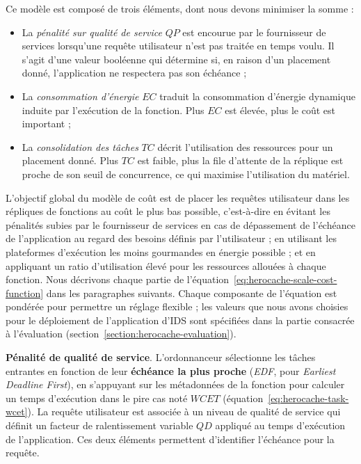 {Ce modèle est composé de trois éléments, dont nous devons minimiser la somme :

\begin{itemize}
    \item La \textit{pénalité sur qualité de service} $QP$ est encourue par le fournisseur de services lorsqu'une requête utilisateur n'est pas traitée en temps voulu. Il s'agit d'une valeur booléenne qui détermine si, en raison d'un placement donné, l'application ne respectera pas son échéance ;
    \item La \textit{consommation d'énergie} $EC$ traduit la consommation d'énergie dynamique induite par l'exécution de la fonction. Plus $EC$ est élevée, plus le coût est important ;
    \item La \textit{consolidation des tâches} $TC$ décrit l'utilisation des ressources pour un placement donné. Plus $TC$ est faible, plus la file d'attente de la réplique est proche de son seuil de concurrence, ce qui maximise l'utilisation du matériel.
\end{itemize}

L'objectif global du modèle de coût est de placer les requêtes utilisateur dans les répliques de fonctions au coût le plus bas possible, c'est-à-dire en évitant les pénalités subies par le fournisseur de services en cas de dépassement de l'échéance de l'application au regard des besoins définis par l'utilisateur ; en utilisant les plateformes d'exécution les moins gourmandes en énergie possible ; et en appliquant un ratio d'utilisation élevé pour les ressources allouées à chaque fonction. Nous décrivons chaque partie de l'équation~\ref{eq:herocache-scale-cost-function} dans les paragraphes suivants. Chaque composante de l'équation est pondérée pour permettre un réglage flexible ; les valeurs que nous avons choisies pour le déploiement de l'application d'IDS sont spécifiées dans la partie consacrée à l'évaluation (section~\ref{section:herocache-evaluation}).

\textbf{Pénalité de qualité de service}. L'ordonnanceur sélectionne les tâches entrantes en fonction de leur \textbf{échéance la plus proche} (\textit{EDF}, pour \textit{Earliest Deadline First}), en s'appuyant sur les métadonnées de la fonction pour calculer un temps d'exécution dans le pire cas noté $WCET$ (équation~\ref{eq:herocache-task-wcet}). La requête utilisateur est associée à un niveau de qualité de service qui définit un facteur de ralentissement variable $QD$ appliqué au temps d'exécution de l'application. Ces deux éléments permettent d'identifier l'échéance pour la requête.

}
